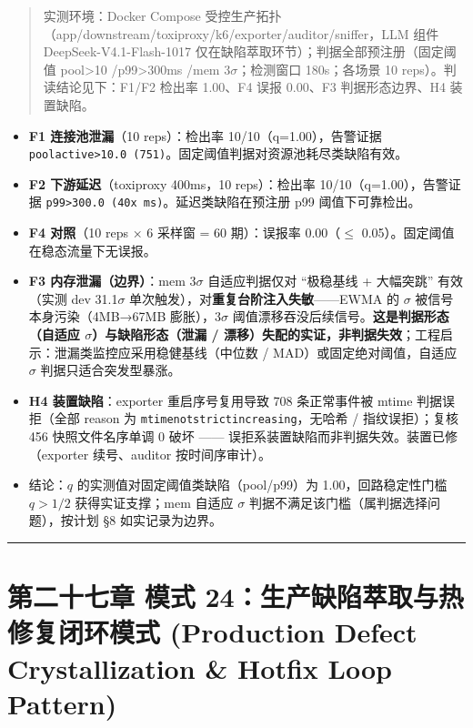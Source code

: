 \documentclass[
]{ctexart}
\renewcommand{\_}{\discretionary{}{}{\textunderscore}}
\let\oldsection\section
\renewcommand{\section}{\clearpage\oldsection}
\begin{document}
\begin{quote}
实测环境：Docker Compose
受控生产拓扑（app/downstream/toxiproxy/k6/exporter/auditor/sniffer，LLM
组件 DeepSeek-V4.1-Flash-1017
仅在缺陷萃取环节）；判据全部预注册（固定阈值 pool\textgreater10
/p99\textgreater300ms /mem 3\(\sigma\)；检测窗口 180s；各场景 10
reps）。判读结论见下：F1/F2 检出率 1.00、F4 误报 0.00、F3
判据形态边界、H4 装置缺陷。
\end{quote}

\begin{itemize}
\item
  \textbf{F1 连接池泄漏}（10 reps）：检出率 10/10（q=1.00），告警证据
  \texttt{pool\_active\textgreater{}10.0\ (751)}。固定阈值判据对资源池耗尽类缺陷有效。
\item
  \textbf{F2 下游延迟}（toxiproxy 400ms，10 reps）：检出率
  10/10（q=1.00），告警证据
  \texttt{p99\textgreater{}300.0\ (40x\ ms)}。延迟类缺陷在预注册 p99
  阈值下可靠检出。
\item
  \textbf{F4 对照}（10 reps × 6 采样窗 = 60 期）：误报率 0.00（\(\le\)
  0.05）。固定阈值在稳态流量下无误报。
\item
  \textbf{F3 内存泄漏（边界）}：mem 3\(\sigma\) 自适应判据仅对
  ``极稳基线 + 大幅突跳'' 有效（实测 dev 31.1\(\sigma\)
  单次触发），对\textbf{重复台阶注入失敏}------EWMA 的 \(\sigma\)
  被信号本身污染（4MB→67MB 膨胀），3\(\sigma\)
  阈值漂移吞没后续信号。\textbf{这是判据形态（自适应
  \(\sigma\)）与缺陷形态（泄漏 /
  漂移）失配的实证，非判据失效}；工程启示：泄漏类监控应采用稳健基线（中位数
  / MAD）或固定绝对阈值，自适应 \(\sigma\) 判据只适合突发型暴涨。
\item
  \textbf{H4 装置缺陷}：exporter 重启序号复用导致 708 条正常事件被 mtime
  判据误拒（全部 reason 为
  \texttt{mtime\_not\_strict\_increasing}，无哈希 / 指纹误拒）；复核 456
  快照文件名序单调 0 破坏 ------
  误拒系装置缺陷而非判据失效。装置已修（exporter 续号、auditor
  按时间序审计）。
\item
  结论：\(q\) 的实测值对固定阈值类缺陷（pool/p99）为
  1.00，回路稳定性门槛 \(q>1/2\) 获得实证支撑；mem 自适应 \(\sigma\)
  判据不满足该门槛（属判据选择问题），按计划 §8 如实记录为边界。
\end{itemize}

\begin{center}\rule{0.5\linewidth}{0.5pt}\end{center}

\section{第二十七章 模式 24：生产缺陷萃取与热修复闭环模式 (Production Defect
Crystallization \& Hotfix Loop
Pattern)}\label{ux6a21ux5f0f-24ux751fux4ea7ux7f3aux9677ux8403ux53d6ux4e0eux70edux4feeux590dux95edux73afux6a21ux5f0f-production-defect-crystallization-hotfix-loop-pattern}
\end{document}

